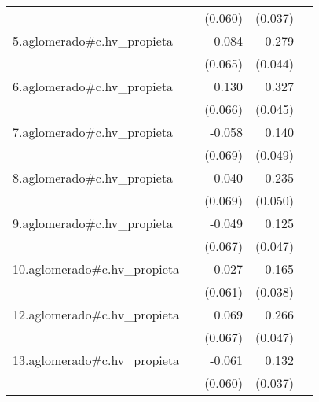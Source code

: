 {\begin{longtable}{l*{4}{D{.}{.}{-1}}}
            &                     &     (0.060)         &     (0.037)         &                     \\
\addlinespace
5.aglomerado#c.hv\_propieta&                     &       0.084         &       0.279\sym{***}&                     \\
            &                     &     (0.065)         &     (0.044)         &                     \\
\addlinespace
6.aglomerado#c.hv\_propieta&                     &       0.130\sym{*}  &       0.327\sym{***}&                     \\
            &                     &     (0.066)         &     (0.045)         &                     \\
\addlinespace
7.aglomerado#c.hv\_propieta&                     &      -0.058         &       0.140\sym{**} &                     \\
            &                     &     (0.069)         &     (0.049)         &                     \\
\addlinespace
8.aglomerado#c.hv\_propieta&                     &       0.040         &       0.235\sym{***}&                     \\
            &                     &     (0.069)         &     (0.050)         &                     \\
\addlinespace
9.aglomerado#c.hv\_propieta&                     &      -0.049         &       0.125\sym{**} &                     \\
            &                     &     (0.067)         &     (0.047)         &                     \\
\addlinespace
10.aglomerado#c.hv\_propieta&                     &      -0.027         &       0.165\sym{***}&                     \\
            &                     &     (0.061)         &     (0.038)         &                     \\
\addlinespace
12.aglomerado#c.hv\_propieta&                     &       0.069         &       0.266\sym{***}&                     \\
            &                     &     (0.067)         &     (0.047)         &                     \\
\addlinespace
13.aglomerado#c.hv\_propieta&                     &      -0.061         &       0.132\sym{***}&                     \\
            &                     &     (0.060)         &     (0.037)         &                     \\

\end{longtable}}

